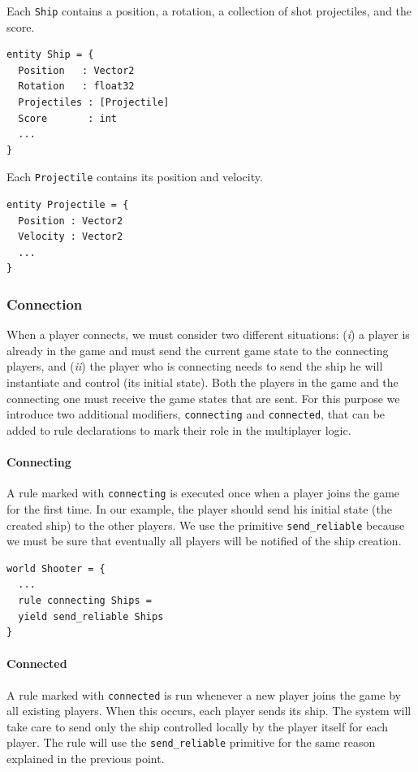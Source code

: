 Each \texttt{Ship} contains a position, a rotation, a collection of shot projectiles, and the score.
\begin{lstlisting}
entity Ship = {
  Position   : Vector2
  Rotation   : float32
  Projectiles : [Projectile]
  Score		  : int
  ...
}

\end{lstlisting}

Each \texttt{Projectile} contains its position and velocity.

\begin{lstlisting}
entity Projectile = {
  Position : Vector2
  Velocity : Vector2
  ...
}
\end{lstlisting}

\subsubsection{Connection}
When a player connects, we must consider two different situations: (\textit{i}) a player is already in the game and must send the current game state to the connecting players, and (\textit{ii}) the player who is connecting needs to send the ship he will instantiate and control (its initial state). Both the players in the game and the connecting one must receive the game states that are sent. For this purpose we introduce two additional modifiers, \texttt{connecting} and \texttt{connected}, that can be added to rule declarations to mark their role in the multiplayer logic.

\paragraph{Connecting} A rule marked with \texttt{connecting} is executed once when a player joins the game for the first time. In our example, the player should send his initial state (the created ship) to the other players. We use the primitive \texttt{send\_reliable} because we must be sure that eventually all players will be notified of the ship creation.
\begin{lstlisting}
world Shooter = {
  ...
  rule connecting Ships =
  yield send_reliable Ships
}
\end{lstlisting}

\paragraph{Connected} A rule marked with \texttt{connected} is run whenever a new player joins the game by all existing players. When this occurs, each player sends its ship. The system will take care to send only the ship controlled locally by the player itself for each player. The rule will use the \texttt{send\_reliable} primitive for the same reason explained in the previous point.


